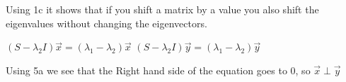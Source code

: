 Using 1c it shows that if you shift a matrix by a value you also shift the eigenvalues without changing the eigenvectors.
	    \begin{center}
	        $(S-\lambda_2I)\vec{x}=(\lambda_1-\lambda_2)\vec{x}$
	        \newline
	        $(S-\lambda_2I)\vec{y}=(\lambda_1-\lambda_2)\vec{y}$
	        \newline
	    \end{center}
	    Using 5a we see that the Right hand side of the equation goes to 0, so $\vec{x}\perp\vec{y}$
	   